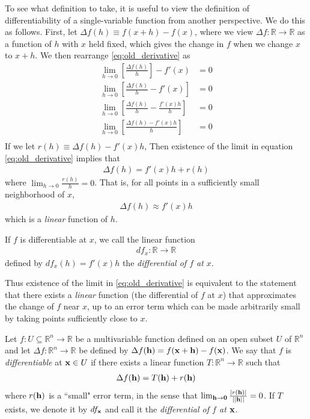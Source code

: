 \documentclass[12pt,letterpaper,reqno]{article}
\numberwithin{equation}{section}
\newcommand{\bh}{{\bf h}}
\newcommand{\R}{\ensuremath{\mathbb R}}
\newcommand{\zv}{{\bf 0}}
\newcommand{\bx}{{\bf x}}
\begin{document}
{To see what definition to take, it is useful to view the definition of differentiability of a single-variable function from another perspective. We do this as follows. First, let $\Delta f(h)\equiv f(x+h)-f(x)$, where we view $\Delta f:\R \to \R$ as a function of $h$ with $x$ held fixed, which gives the change in $f$ when we change $x$ to $x+h$. We then rearrange \eqref{eq:old_derivative} as 
\begin{align*}
	\lim_{h \to 0}\left[\frac{\Delta f(h)}{h}\right]-f'(x)&=0 \\
	\lim_{h \to 0}\left[\frac{\Delta f(h)}{h}-f'(x)\right]&=0 \\
	\lim_{h \to 0}\left[\frac{\Delta f(h)}{h}-\frac{f'(x)h}{h}\right]&=0 \\
	\lim_{h \to 0}\left[\frac{\Delta f(h)-f'(x)h}{h}\right]&=0 \\
\end{align*} 
If we let $r(h) \equiv \Delta f(h)-f'(x)h$, Then existence of the limit in equation \eqref{eq:old_derivative} implies that 
\begin{align}
	\Delta f(h)=f'(x)h+r(h)
\end{align}
where $\lim_{h \to 0}\frac{r(h)}{h}=0$. That is, for all points in a sufficiently small neighborhood of $x$,
\begin{align}
	\Delta f(h) \approx f'(x)h
\end{align}
which is a \emph{linear} function of $h$. 
\begin{defn}
If $f$ is differentiable at $x$, we call the linear function 
\begin{align*}
	df_x:\R \to \R
\end{align*}	
defined by $df_x(h)=f'(x)h$ the \emph{differential of $f$ at $x$}.
\end{defn}
Thus existence of the limit in \eqref{eq:old_derivative} is equivalent to the statement that there exists a \emph{linear} function (the differential of $f$ at $x$) that approximates the change of $f$ near $x$, up to an error term which can be made arbitrarily small by taking points sufficiently close to $x$.

\begin{defn}\label{def:differentiable_mv_function}
Let $f:U \subseteq \R^n \to \R$ be a multivariable function defined on an open subset $U$ of $\R^n$ and let $\Delta f:\R^n \to \R$ be defined by $\Delta f(\bh)=f(\bx + \bh)-f(\bx)$. We say that $f$ is \emph{differentiable} at $\bx \in U$ if there exists a linear function $T:\R^n \to \R$ such that  
\begin{align*}
	\Delta f(\bh)=T(\bh)+r(\bh)
\end{align*}	
where $r(\bh)$ is a ``small" error term, in the sense that $\lim_{\bh \to \zv}\frac{|r(\bh)|}{||\bh||}=0$. If $T$ exists, we denote it by $df_\bx$ and call it the \emph{differential of $f$ at $\bx$}. 


\end{defn}}
\end{document}
